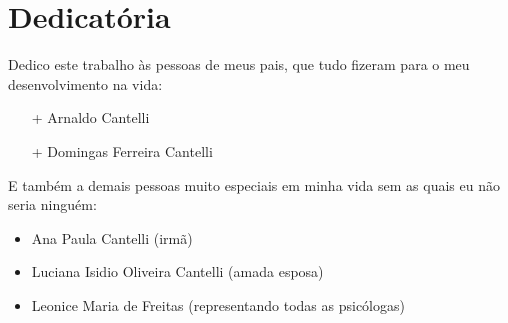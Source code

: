 
\thispagestyle{empty}

\chapter{Dedicatória}

Dedico este trabalho às pessoas de meus pais, que tudo fizeram para o meu desenvolvimento na vida:
\begin{itemize}
    \item[+] Arnaldo Cantelli
    \item[+] Domingas Ferreira Cantelli
\end{itemize}

E também a demais pessoas muito especiais em minha vida sem as quais eu não seria ninguém:
\begin{itemize}
    \item Ana Paula Cantelli (irmã)
    \item Luciana Isidio Oliveira Cantelli (amada esposa)
    \item Leonice Maria de Freitas (representando todas as psicólogas)
\end{itemize}